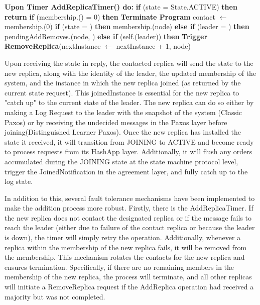 \documentclass[sigconf]{acmart}
\begin{document}
\begin{algorithmic}[1]
\State \textbf{Upon Timer AddReplicaTimer() do:}
\State \quad \textbf{if} (state = State.ACTIVE) \textbf{then}
\State \quad \quad \textbf{return}
\State \quad \textbf{if} (membership.() = 0) \textbf{then}
\State \quad \quad \textbf{Terminate Program}
\State \quad contact $\gets$ membership.(0)
\State \quad \textbf{if} (state = ) \textbf{then}
\State \quad \quad membership.(node)
\State \quad \textbf{else if} (leader = ) \textbf{then}
\State \quad \quad pendingAddRemoves.(node, )
\State \quad \textbf{else if} (self.(leader)) \textbf{then}
\State \quad \quad \textbf{Trigger RemoveReplica}(nextInstance $\gets$ nextInstance + 1, node) \\
\end{algorithmic}

Upon receiving the state in reply, the contacted replica will send the state to the new replica, along with the identity of the leader, the updated membership of the system, and the instance in which the new replica joined (as returned by the current state request). This joinedInstance is essential for the new replica to "catch up" to the current state of the leader. The new replica can do so either by making a Log Request to the leader with the snapshot of the system (Classic Paxos) or by receiving the undecided messages in the Paxos layer before joining(Distinguished Learner Paxos). Once the new replica has installed the state it received, it will transition from JOINING to ACTIVE and become ready to process requests from its HashApp layer. Additionally, it will flush any orders accumulated during the JOINING state at the state machine protocol level, trigger the JoinedNotification in the agreement layer, and fully catch up to the log state.

In addition to this, several fault tolerance mechanisms have been implemented to make the addition process more robust. Firstly, there is the AddReplicaTimer. If the new replica does not contact the designated replica or if the message fails to reach the leader (either due to failure of the contact replica or because the leader is down), the timer will simply retry the operation. Additionally, whenever a replica within the membership of the new replica fails, it will be removed from the membership. This mechanism rotates the contacts for the new replica and ensures termination. Specifically, if there are no remaining members in the membership of the new replica, the process will terminate, and all other replicas will initiate a RemoveReplica request if the AddReplica operation had received a majority but was not completed.
\end{document}
